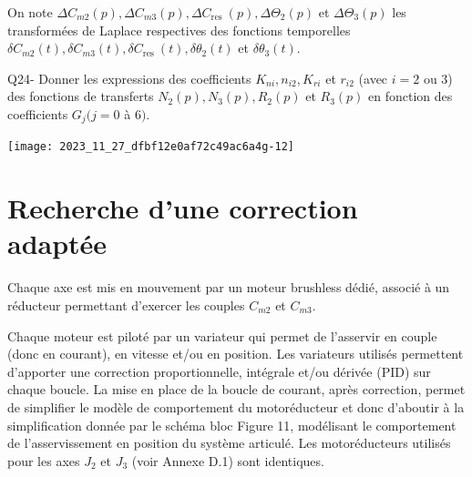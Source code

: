 \documentclass[10pt]{article}
\begin{document}
On note $\Delta C_{m 2}(p), \Delta C_{m 3}(p), \Delta C_{\text {res }}(p), \Delta \Theta_{2}(p)$ et $\Delta \Theta_{3}(p)$ les transformées de Laplace respectives des fonctions temporelles $\delta C_{m 2}(t), \delta C_{m 3}(t), \delta C_{\text {res }}(t), \delta \theta_{2}(t)$ et $\delta \theta_{3}(t)$.

Q24- Donner les expressions des coefficients $K_{n i}, n_{i 2}, K_{r i}$ et $r_{i 2}$ (avec $i=2$ ou 3) des fonctions de transferts $N_{2}(p), N_{3}(p), R_{2}(p)$ et $R_{3}(p)$ en fonction des coefficients $G_{j}(j=0$ à 6$)$.

\begin{center}
\texttt{[image: 2023\_11\_27\_dfbf12e0af72c49ac6a4g-12]}
\end{center}

\section*{Recherche d'une correction adaptée}
Chaque axe est mis en mouvement par un moteur brushless dédié, associé à un réducteur permettant d'exercer les couples $C_{m 2}$ et $C_{m 3}$.

Chaque moteur est piloté par un variateur qui permet de l'asservir en couple (donc en courant), en vitesse et/ou en position. Les variateurs utilisés permettent d'apporter une correction proportionnelle, intégrale et/ou dérivée (PID) sur chaque boucle. La mise en place de la boucle de courant, après correction, permet de simplifier le modèle de comportement du motoréducteur et donc d'aboutir à la simplification donnée par le schéma bloc Figure 11, modélisant le comportement de l'asservissement en position du système articulé. Les motoréducteurs utilisés pour les axes $J_{2}$ et $J_{3}$ (voir Annexe D.1) sont identiques.
\end{document}
